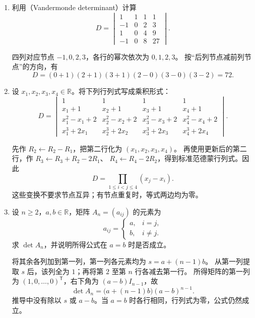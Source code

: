 \documentclass[UTF8,12pt,a4paper,fontset=fandol]{ctexart}
\begin{document}
\begin{enumerate}[label=\arabic*.,resume=detquestions]
\item\label{q:vandermonde-numeric}
利用（Vandermonde determinant）计算
\[
D=\begin{vmatrix}
1&1&1&1\\-1&0&2&3\\1&0&4&9\\-1&0&8&27
\end{vmatrix}.
\]
\begin{solve}
四列对应节点 $-1,0,2,3$，各行的幂次依次为 $0,1,2,3$。
按“后列节点减前列节点”的方向，有
\[
D=(0+1)(2+1)(3+1)(2-0)(3-0)(3-2)=72.
\]
\end{solve}

\item\label{q:polynomial-four}
设 $x_1,x_2,x_3,x_4\in\mathbb R$。将下列行列式写成乘积形式：
\[
D=\begin{vmatrix}
1&1&1&1\\
x_1+1&x_2+1&x_3+1&x_4+1\\
x_1^2-x_1+2&x_2^2-x_2+2&x_3^2-x_3+2&x_4^2-x_4+2\\
x_1^3+2x_1&x_2^3+2x_2&x_3^3+2x_3&x_4^3+2x_4
\end{vmatrix}.
\]
\begin{solve}
先作 $R_2\leftarrow R_2-R_1$，把第二行化为 $(x_1,x_2,x_3,x_4)$。
再使用更新后的第二行，作 $R_3\leftarrow R_3+R_2-2R_1$、
$R_4\leftarrow R_4-2R_2$，得到标准范德蒙行列式。因此
\[
D=\prod_{1\leq i<j\leq4}(x_j-x_i).
\]
这些变换不要求节点互异；有节点重复时，等式两边均为零。
\end{solve}

\item\label{q:constant-off-diagonal}
设 $n\geq2$，$a,b\in\mathbb R$，矩阵 $A_n=(a_{ij})$ 的元素为
\[
a_{ij}=\begin{cases}a,&i=j,\\b,&i\ne j.\end{cases}
\]
求 $\det A_n$，并说明所得公式在 $a=b$ 时是否成立。
\begin{solve}
将其余各列加到第一列，第一列各元素均为 $s=a+(n-1)b$。
从第一列提取 $s$ 后，该列全为 $1$；再将第 $2$ 至第 $n$ 行各减去第一行。
所得矩阵的第一列为 $(1,0,\ldots,0)^{\mathsf T}$，右下角为 $(a-b)I_{n-1}$，故
\[
\boxed{\det A_n=\bigl(a+(n-1)b\bigr)(a-b)^{n-1}.}
\]
推导中没有除以 $s$ 或 $a-b$。当 $a=b$ 时各行相同，行列式为零，公式仍然成立。
\end{solve}


\end{enumerate}
\end{document}
